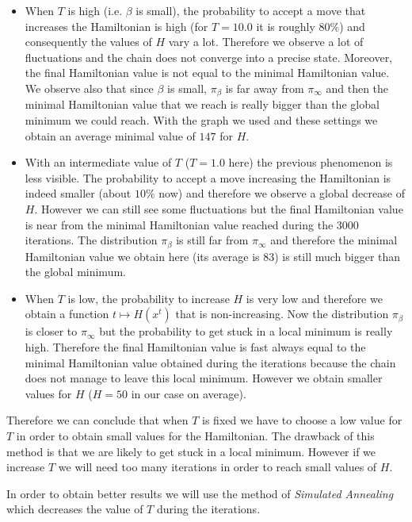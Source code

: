 \documentclass[a4paper]{article}
\begin{document}
\begin{itemize}
\item When $T$ is high (i.e. $\beta$ is small), the probability to accept a move that increases the Hamiltonian is high (for $T=10.0$ it is roughly $80\%$) and consequently the values of $H$ vary a lot. Therefore we observe a lot of fluctuations and the chain does not converge into a precise state. Moreover, the final Hamiltonian value is not equal to the minimal Hamiltonian value. We observe also that since $\beta$ is small, $\pi_{\beta}$ is far away from $\pi_{\infty}$ and then the minimal Hamiltonian value that we reach is really bigger than the global minimum we could reach. With the graph we used and these settings we obtain an average minimal value of $147$ for $H$.
\item With an intermediate value of $T$ ($T=1.0$ here) the previous phenomenon is less visible. The probability to accept a move increasing the Hamiltonian is indeed smaller (about $10\%$ now) and therefore we observe a global decrease of $H$. However we can still see some fluctuations but the final Hamiltonian value is near from the minimal Hamiltonian value reached during the $3000$ iterations. The distribution $\pi_{\beta}$ is still far from $\pi_{\infty}$ and therefore the minimal Hamiltonian value we obtain here (its average is $83$) is still much bigger than the global minimum.
\item When $T$ is low, the probability to increase $H$ is very low and therefore we obtain a function $t \mapsto H(x^t)$ that is non-increasing. Now the distribution $\pi_{\beta}$ is closer to $\pi_{\infty}$ but the probability to get stuck in a local minimum is really high. Therefore the final Hamiltonian value is fast always equal to the minimal Hamiltonian value obtained during the iterations because the chain does not manage to leave this local minimum. However we obtain smaller values for $H$ ($H=50$ in our case on average).
\end{itemize}

Therefore we can conclude that when $T$ is fixed we have to choose a low value for $T$ in order to obtain small values for the Hamiltonian. The drawback of this method is that we are likely to get stuck in a local minimum. However if we increase $T$ we will need too many iterations in order to reach small values of $H$.

In order to obtain better results we will use the method of \textit{Simulated Annealing} which decreases the value of $T$ during the iterations.
\end{document}
